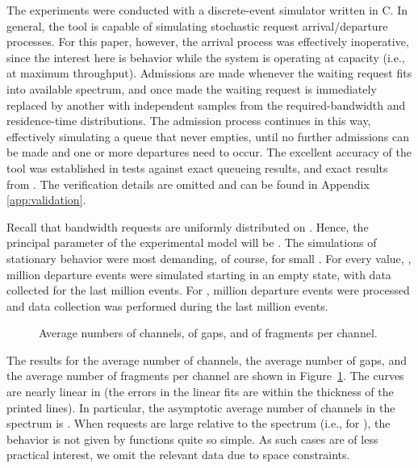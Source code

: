 \documentclass{amsart}
\begin{document}
The experiments were conducted with a discrete-event
simulator written in C. In general,
the tool is capable of simulating stochastic request
arrival/departure processes. For this paper, however, the arrival process
was effectively inoperative, since the interest here is behavior while the
system is operating at capacity (i.e., at maximum throughput). Admissions are
made whenever the waiting request fits into available spectrum, and once made
the waiting request is immediately replaced by another with independent samples
from the  required-bandwidth and residence-time distributions.
The admission process continues in this way,
effectively simulating a queue that never empties, until no
further admissions can be made and one or more departures need to occur.
The excellent accuracy of the tool was established in tests
against exact queueing results, and exact
results from \cite{KipnisR1990}.  The verification details are omitted and can be found in Appendix \ref{app:validation}.

Recall that bandwidth requests are uniformly distributed on . Hence, the principal parameter of the experimental model will be . The simulations of stationary behavior were most demanding, of
course, for small . For every  value, , 
million departure events were simulated starting in an empty state,
with data collected for the last  million events. For ,  million departure events were processed and data
collection was performed during the last  million events.

\begin{figure}[!t]
\begin{center}
 \caption{Average numbers of channels, of gaps, and of fragments per
 channel.}
 \label{fig-linear-frag}
\end{center}
\end{figure}

The results for
the average number of channels, the average number of gaps, and the
average number of fragments per channel are shown in Figure~\ref{fig-linear-frag}. The curves are nearly linear in  (the errors in the linear fits are within the thickness of the printed
lines). In particular, the asymptotic
average number of channels in the spectrum is . When requests are large relative to the spectrum
(i.e., for ), the behavior is not given by functions
quite so simple. As such cases are of less practical
interest, we omit the relevant data due to space
constraints.
\end{document}
